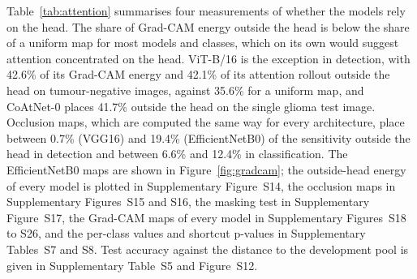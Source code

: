 \documentclass[final,3p,times,number]{elsarticle}
\begin{document}
Table~\ref{tab:attention} summarises four measurements of whether the models rely on the head. The share of Grad-CAM energy outside the head is below the share of a uniform map for most models and classes, which on its own would suggest attention concentrated on the head. ViT-B/16 is the exception in detection, with 42.6\% of its Grad-CAM energy and 42.1\% of its attention rollout outside the head on tumour-negative images, against 35.6\% for a uniform map, and CoAtNet-0 places 41.7\% outside the head on the single glioma test image. Occlusion maps, which are computed the same way for every architecture, place between 0.7\% (VGG16) and 19.4\% (EfficientNetB0) of the sensitivity outside the head in detection and between 6.6\% and 12.4\% in classification. The EfficientNetB0 maps are shown in Figure~\ref{fig:gradcam}; the outside-head energy of every model is plotted in Supplementary Figure~S14, the occlusion maps in Supplementary Figures~S15 and S16, the masking test in Supplementary Figure~S17, the Grad-CAM maps of every model in Supplementary Figures~S18 to S26, and the per-class values and shortcut p-values in Supplementary Tables~S7 and S8. Test accuracy against the distance to the development pool is given in Supplementary Table~S5 and Figure~S12.
\end{document}
